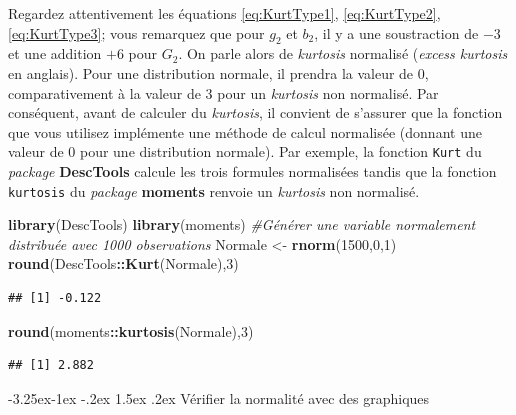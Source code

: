 \documentclass[
  11pt,
  french,
]{book}
\makeatletter
\newenvironment{Shaded}{\begin{snugshade}}{\end{snugshade}}
\newcommand{\CommentTok}[1]{\textcolor[rgb]{0.56,0.35,0.01}{\textit{#1}}}
\newcommand{\DecValTok}[1]{\textcolor[rgb]{0.00,0.00,0.81}{#1}}
\newcommand{\KeywordTok}[1]{\textcolor[rgb]{0.13,0.29,0.53}{\textbf{#1}}}
\newcommand{\NormalTok}[1]{#1}
\newcommand{\OperatorTok}[1]{\textcolor[rgb]{0.81,0.36,0.00}{\textbf{#1}}}
\newcommand{\StringTok}[1]{\textcolor[rgb]{0.31,0.60,0.02}{#1}}
\newenvironment{kframe}{%
\medskip{}
\setlength{\fboxsep}{.8em}
 \def\at@end@of@kframe{}%
 \ifinner\ifhmode%
  \def\at@end@of@kframe{\end{minipage}}%
  \begin{minipage}{\columnwidth}%
 \fi\fi%
 \def\FrameCommand##1{\hskip\@totalleftmargin \hskip-\fboxsep
 \colorbox{shadecolor}{##1}\hskip-\fboxsep
     \hskip-\linewidth \hskip-\@totalleftmargin \hskip\columnwidth}%
 \MakeFramed {\advance\hsize-\width
   \@totalleftmargin\z@ \linewidth\hsize
   \@setminipage}}%
 {\par\unskip\endMakeFramed%
 \at@end@of@kframe}
\newenvironment{kframev}{%
\medskip{}
\setlength{\fboxsep}{.8em}
 \def\at@end@of@kframev{}%
 \ifinner\ifhmode%
  \def\at@end@of@kframev{\end{minipage}}%
  \begin{minipage}{\columnwidth}%
 \fi\fi%
 \def\FrameCommand##1{\hskip\@totalleftmargin \hskip-\fboxsep
 \colorbox{shadebluecolor}{##1}\hskip-\fboxsep
     \hskip-\linewidth \hskip-\@totalleftmargin \hskip\columnwidth}%
 \MakeFramed {\advance\hsize-\width
   \@totalleftmargin\z@ \linewidth\hsize
   \@setminipage}}%
 {\par\unskip\endMakeFramed%
 \at@end@of@kframev}
\renewenvironment{Shaded}{\begin{kframe}}{\end{kframe}}
\newenvironment{rmdblock}[1]
  {
  \begin{itemize}
  \renewcommand{\labelitemi}{
    \raisebox{-.7\height}[0pt][0pt]{
      {\setkeys{Gin}{width=3em,keepaspectratio}\texttt{[image: images/\#1]}}
    }
  }
  \setlength{\fboxsep}{1em}
  \begin{kframev}
  \small
  \item
  }
  {
  \end{kframev}
  \end{itemize}
  }
\newenvironment{bloc_attention}
  {\begin{rmdblock}{attention}}
  {\end{rmdblock}}
\renewcommand\paragraph{\@startsection{paragraph}{4}{\z@}%
   {-3.25ex\@plus -1ex \@minus -.2ex}%
   {1.5ex \@plus .2ex}%
   {\normalfont\normalsize\bfseries}}
\makeatother
\begin{document}
\begin{bloc_attention}

Regardez attentivement les équations \eqref{eq:KurtType1}, \eqref{eq:KurtType2}, \eqref{eq:KurtType3}; vous remarquez que pour \(g_2\) et \(b_2\), il y a une soustraction de \(-3\) et une addition \(+6\) pour \(G_2\). On parle alors de \emph{kurtosis} normalisé (\emph{excess kurtosis} en anglais). Pour une distribution normale, il prendra la valeur de 0, comparativement à la valeur de 3 pour un \emph{kurtosis} non normalisé. Par conséquent, avant de calculer du \emph{kurtosis}, il convient de s'assurer que la fonction que vous utilisez implémente une méthode de calcul normalisée (donnant une valeur de 0 pour une distribution normale). Par exemple, la fonction \texttt{Kurt} du \emph{package} \textbf{DescTools} calcule les trois formules normalisées tandis que la fonction \texttt{kurtosis} du \emph{package} \textbf{moments} renvoie un \emph{kurtosis} non normalisé.

\begin{Shaded}
\begin{Highlighting}[]
\KeywordTok{library}\NormalTok{(DescTools)}
\KeywordTok{library}\NormalTok{(moments)}
\CommentTok{#Générer une variable normalement distribuée avec 1000 observations}
\NormalTok{Normale <-}\StringTok{ }\KeywordTok{rnorm}\NormalTok{(}\DecValTok{1500}\NormalTok{,}\DecValTok{0}\NormalTok{,}\DecValTok{1}\NormalTok{)}
\KeywordTok{round}\NormalTok{(DescTools}\OperatorTok{::}\KeywordTok{Kurt}\NormalTok{(Normale),}\DecValTok{3}\NormalTok{)}
\end{Highlighting}
\end{Shaded}

\begin{verbatim}
## [1] -0.122
\end{verbatim}

\begin{Shaded}
\begin{Highlighting}[]
\KeywordTok{round}\NormalTok{(moments}\OperatorTok{::}\KeywordTok{kurtosis}\NormalTok{(Normale),}\DecValTok{3}\NormalTok{)}
\end{Highlighting}
\end{Shaded}

\begin{verbatim}
## [1] 2.882
\end{verbatim}

\end{bloc_attention}

\hypertarget{vuxe9rifier-la-normalituxe9-avec-des-graphiques}{%
\paragraph{Vérifier la normalité avec des graphiques}\label{vuxe9rifier-la-normalituxe9-avec-des-graphiques}}
\end{document}
